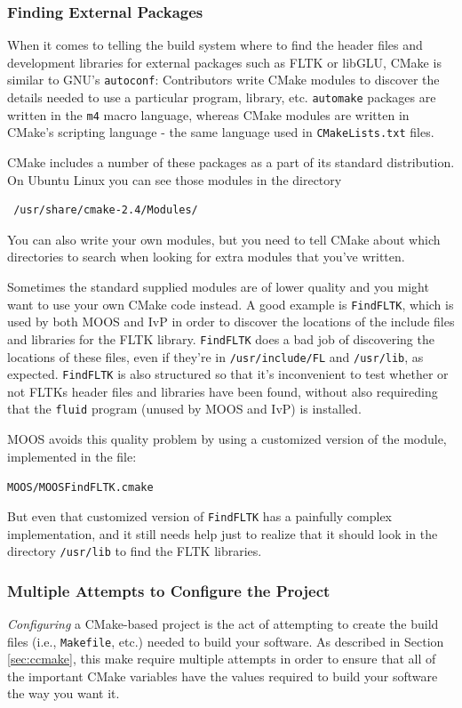 \documentclass[letterpaper,10pt]{article}
\begin{document}
\subsubsection{Finding External Packages}
When it comes to telling the build system where to find the header files and
development libraries for external packages such as FLTK or libGLU, CMake is
similar to GNU's \verb|autoconf|:  Contributors write CMake modules to discover 
the details needed to use a particular program, library, etc.  \verb|automake|
packages are written in the \verb|m4| macro language, whereas CMake modules are
written in CMake's scripting language - the same language used in 
\verb|CMakeLists.txt| files.  

CMake includes a number of these packages as a 
part of its standard distribution.  On Ubuntu Linux you can see those modules
in the directory 

\begin{verbatim}
 /usr/share/cmake-2.4/Modules/
\end{verbatim} 


You can also write your
own modules, but you need to tell CMake about which directories to search when
looking for extra modules that you've written.

Sometimes the standard supplied modules are of lower quality and you might want
to use your own CMake code instead.  A good example is \verb|FindFLTK|, 
which is used by both MOOS and IvP in order to discover the locations of the
include files and libraries for the FLTK library.  \verb|FindFLTK| does a bad
job of discovering the locations of these files, even if they're in
\verb|/usr/include/FL| and \verb|/usr/lib|, as expected.  \verb|FindFLTK| is 
also structured so that it's inconvenient to test whether or not FLTKs header
files and libraries have been found, without also requireding that the 
\verb|fluid| program (unused by MOOS and IvP) is installed.

MOOS avoids this quality problem by using a customized version of the module,
implemented in the file:

\verb|MOOS/MOOSFindFLTK.cmake|

But even that customized version of \verb|FindFLTK| has a painfully complex
implementation, and it still needs help just to realize that it should look
in the directory \verb|/usr/lib|
to find the FLTK libraries.


\subsubsection{Multiple Attempts to Configure the Project}
\textit{Configuring} a CMake-based project is the act of attempting to create
the build files (i.e., \verb|Makefile|, etc.) needed to build your software.
As described in Section \ref{sec:ccmake}, this make require multiple attempts
in order to ensure that all of the important CMake variables have the values
required to build your software the way you want it.
\end{document}
